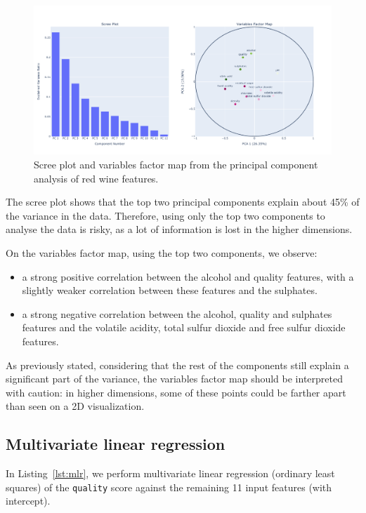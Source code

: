 \documentclass[12pt]{article}
\begin{document}
  \begin{figure}[!ht]
    \centering
    \includegraphics[width=\textwidth]{figures/pcaredwine}
    \caption{Scree plot and variables factor map from the principal component
      analysis of red wine features.}%
    \label{fig:pcaredwine}
  \end{figure} 

  The scree plot shows that the top two principal components explain about 45\%
  of the variance in the data. Therefore, using only the top two components to
  analyse the data is risky, as a lot of information is lost in the higher
  dimensions.

  On the variables factor map, using the top two components, we observe: 
  \begin{itemize}
    \item a strong positive correlation between the alcohol and quality
      features, with a slightly weaker correlation between these features and
      the sulphates.
    \item a strong negative correlation between the alcohol, quality and
    sulphates features and the volatile acidity, total sulfur dioxide and free
    sulfur dioxide features.
  \end{itemize}

  As previously stated, considering that the rest of the components still
  explain a significant part of the variance, the variables factor map should
  be interpreted with caution: in higher dimensions, some of these points could
  be farther apart than seen on a 2D visualization.

  \subsection{Multivariate linear regression}

  In Listing~\ref{lst:mlr}, we perform multivariate linear regression (ordinary
  least squares) of the \lstinline{quality} score against the remaining 11
  input features (with intercept).
\end{document}

